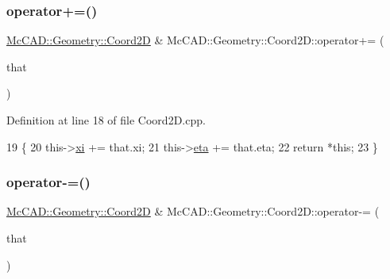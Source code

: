 \mbox{\label{classMcCAD_1_1Geometry_1_1Coord2D_a6907af9ed880c7254ec197a0c1091511}} 
\subsubsection{\texorpdfstring{operator+=()}{operator+=()}\hspace{0.1cm}{\footnotesize\ttfamily [2/2]}}
{\footnotesize\ttfamily \hyperlink{classMcCAD_1_1Geometry_1_1Coord2D}{Mc\+C\+A\+D\+::\+Geometry\+::\+Coord2D} \& Mc\+C\+A\+D\+::\+Geometry\+::\+Coord2\+D\+::operator+= (\begin{DoxyParamCaption}\item[{const \hyperlink{classMcCAD_1_1Geometry_1_1Coord2D}{Coord2D} \&}]{that }\end{DoxyParamCaption})}



Definition at line 18 of file Coord2\+D.\+cpp.


\begin{DoxyCode}
19                             \{
20     this->\hyperlink{classMcCAD_1_1Geometry_1_1Coord2D_a5b99b9ce570b6bd792bd485fb2f305bb}{xi} += that.xi;
21     this->\hyperlink{classMcCAD_1_1Geometry_1_1Coord2D_afa71c0967f3d43fe50e61abd731c8f5e}{eta} += that.eta;
22     \textcolor{keywordflow}{return} *\textcolor{keyword}{this};
23 \}
\end{DoxyCode}
\mbox{\label{classMcCAD_1_1Geometry_1_1Coord2D_af92efc0d752089b0a9ed0608335f92aa}} 
\subsubsection{\texorpdfstring{operator-\/=()}{operator-=()}\hspace{0.1cm}{\footnotesize\ttfamily [1/2]}}
{\footnotesize\ttfamily \hyperlink{classMcCAD_1_1Geometry_1_1Coord2D}{Mc\+C\+A\+D\+::\+Geometry\+::\+Coord2D} \& Mc\+C\+A\+D\+::\+Geometry\+::\+Coord2\+D\+::operator-\/= (\begin{DoxyParamCaption}\item[{const \hyperlink{classMcCAD_1_1Geometry_1_1Coord2D}{Coord2D} \&}]{that }\end{DoxyParamCaption})}



